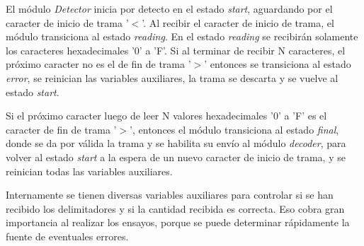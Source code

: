 	El módulo \textit{Detector} inicia por detecto en el estado \textit{start}, aguardando por el caracter de inicio de trama '$<$'. Al recibir el caracter de inicio de trama, el módulo transiciona al estado \textit{reading}. En el estado \textit{reading} se recibirán solamente los caracteres hexadecimales '0' a 'F'. Si al terminar de recibir N caracteres, el próximo caracter no es el de fin de trama '$>$' entonces se transiciona al estado \textit{error}, se reinician las variables auxiliares, la trama se descarta y se vuelve al estado \textit{start}.
	
	Si el próximo caracter luego de leer N valores hexadecimales '0' a 'F' es el caracter de fin de trama '$>$', entonces el módulo transiciona al estado \textit{final}, donde se da por válida la trama y se habilita su envío al módulo \textit{decoder}, para volver al estado \textit{start} a la espera de un nuevo caracter de inicio de trama, y se reinician todas las variables auxiliares.
	
	Internamente se tienen diversas variables auxiliares para controlar si se han recibido los delimitadores y si la cantidad recibida es correcta. Eso cobra gran importancia al realizar los ensayos, porque se puede determinar rápidamente la fuente de eventuales errores.